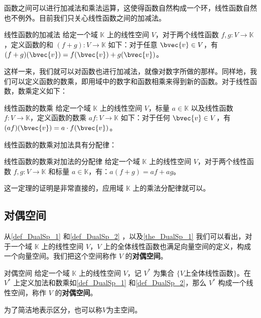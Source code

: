 函数之间可以进行加减法和乘法运算，这使得函数自然构成一个环，线性函数自然也不例外。目前我们只关心线性函数之间的加减法。

\begin{definition}{线性函数的加减法}\label{def_DualSp_1}
给定一个域 $\mathbb{K}$ 上的线性空间 $V$，对于两个线性函数 $f, g: V\rightarrow\mathbb{K}$，定义函数的和 $(f+g):V\rightarrow\mathbb{K}$ 如下：对于任意 $\bvec{v}\in V$，有 $(f+g)(\bvec{v})=f(\bvec{v})+g(\bvec{v})$。
\end{definition}

这样一来，我们就可以对函数也进行加减法，就像对数字所做的那样。同样地，我们可以定义函数的数乘，即用域中的数字和函数相乘来得到新的函数。对于线性函数，数乘定义如下：

\begin{definition}{线性函数的数乘}\label{def_DualSp_2}
给定一个域 $\mathbb{K}$ 上的线性空间 $V$，标量 $a\in\mathbb{K}$ 以及线性函数 $f: V\rightarrow\mathbb{K}$，定义函数的数乘 $af:V\rightarrow\mathbb{K}$ 如下：对于任何 $\bvec{v}\in V$，有 $(af)(\bvec{v})=a\cdot f(\bvec{v})$。
\end{definition}

线性函数的数乘对加法具有分配律：

\begin{theorem}{线性函数的数乘对加法的分配律}\label{the_DualSp_1}
给定一个域 $\mathbb{K}$ 上的线性空间 $V$，对于两个线性函数 $f, g: V\rightarrow\mathbb{K}$ 和标量 $a\in\mathbb{K}$，有：$a(f+g)=af+ag$。
\end{theorem}

这一定理的证明是非常直接的，应用域 $\mathbb{K}$ 上的乘法分配律就可以。

\subsection{对偶空间}

从\autoref{def_DualSp_1} 和\autoref{def_DualSp_2} ，以及\autoref{the_DualSp_1} 我们可以看出，对于一个域 $\mathbb{K}$ 上的线性空间 $V$，$V$ 上的全体线性函数也满足向量空间的定义，构成一个向量空间。我们把这个空间称作 $V$ 的\textbf{对偶空间}。

\begin{definition}{对偶空间}
给定一个域 $\mathbb{K}$ 上的线性空间 $V$，记 $V^*$ 为集合 $\{V\text{上全体线性函数}\}$。在 $V^*$ 上定义加法和数乘如\autoref{def_DualSp_1} 和\autoref{def_DualSp_2}，那么 $V^*$ 构成一个线性空间，称作 $V$ 的\textbf{对偶空间}。

为了简洁地表示区分，也可以称$V$为主空间。
\end{definition}

